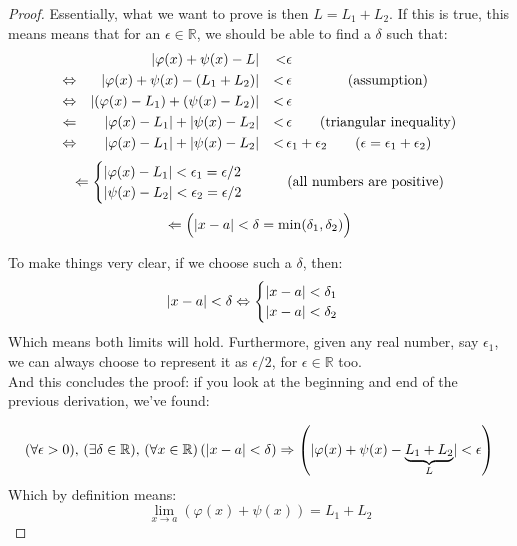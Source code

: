 \documentclass[solutions.tex]{subfiles}
\begin{document}
\begin{proof}
Essentially, what we want to prove is then $L = L_1 + L_2$. If this
is true, this means means that for an $\epsilon\in\mathbb{R}$, we
should be able to find a $\delta$ such that:
\begin{equation*} \begin{aligned}
	~ && \abs{\varphi(x)+\psi(x)-L} &&<& \epsilon \\
	\Leftrightarrow && \abs{\varphi(x)+\psi(x)-(L_1+L_2)} &&<\,& \epsilon
		\qquad\qquad\text{(assumption)} \\
	\Leftrightarrow && \abs{(\varphi(x)-L_1)+(\psi(x)-L_2)} &&<\,& \epsilon \\
	\Leftarrow && \abs{\varphi(x)-L_1}+\abs{\psi(x)-L_2} &&<\,& \epsilon
		\qquad\text{(triangular inequality)} \\
	\Leftrightarrow && \abs{\varphi(x)-L_1}+\abs{\psi(x)-L_2} &&<\,& \epsilon_1+\epsilon_2
		\qquad(\epsilon = \epsilon_1+\epsilon_2)
\end{aligned} \end{equation*}
\[
	\Leftarrow \begin{cases}
		\abs{\varphi(x)-L_1} < \epsilon_1 = \epsilon/2 \\
		\abs{\psi(x)-L_2} < \epsilon_2 = \epsilon/2
	\end{cases}\qquad\text{(all numbers are positive)}
\]
\[
	\Leftarrow\Bigl(\abs{x-a}<\delta=\min(\delta_1,\delta_2)\Bigr)
\]

To make things very clear, if we choose such a $\delta$, then:
\[
	\abs{x-a}<\delta \Leftrightarrow \begin{cases}
		\abs{x-a} < \delta_1 \\
		\abs{x-a} < \delta_2
	\end{cases}
\]
Which means both limits will hold. Furthermore, given any real
number, say $\epsilon_1$, we can always choose to represent it as
$\epsilon/2$, for $\epsilon\in\mathbb{R}$ too. \\


And this concludes the proof: if you look at the beginning and end of
the previous derivation, we've found:

\[ \epsdelta{\epsilon}{\delta}{a}{x}{\varphi(x)+\psi(x)}{\underbrace{L_1+L_2}_L} \]
Which by definition means:
\[
	\lim_{x\rightarrow a}\left(\varphi(x)+\psi(x)\right) = L_1+L_2
\]
\end{proof}
\end{document}
